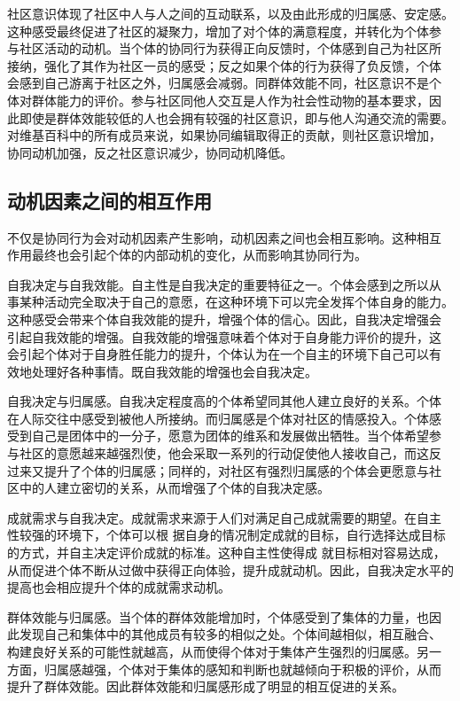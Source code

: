 社区意识体现了社区中人与人之间的互动联系，以及由此形成的归属感、安定感。
这种感受最终促进了社区的凝聚力，增加了对个体的满意程度，并转化为个体参
与社区活动的动机。当个体的协同行为获得正向反馈时，个体感到自己为社区所
接纳，强化了其作为社区一员的感受；反之如果个体的行为获得了负反馈，个体
会感到自己游离于社区之外，归属感会减弱。同群体效能不同，社区意识不是个
体对群体能力的评价。参与社区同他人交互是人作为社会性动物的基本要求，因
此即使是群体效能较低的人也会拥有较强的社区意识，即与他人沟通交流的需要。
对维基百科中的所有成员来说，如果协同编辑取得正的贡献，则社区意识增加，
协同动机加强，反之社区意识减少，协同动机降低。


\subsection{动机因素之间的相互作用}
\label{sec:interaction}
不仅是协同行为会对动机因素产生影响，动机因素之间也会相互影响。这种相互
作用最终也会引起个体的内部动机的变化，从而影响其协同行为。

自我决定与自我效能。自主性是自我决定的重要特征之一。个体会感到之所以从
事某种活动完全取决于自己的意愿，在这种环境下可以完全发挥个体自身的能力。
这种感受会带来个体自我效能的提升，增强个体的信心。因此，自我决定增强会
引起自我效能的增强。自我效能的增强意味着个体对于自身能力评价的提升，这
会引起个体对于自身胜任能力的提升，个体认为在一个自主的环境下自己可以有
效地处理好各种事情。既自我效能的增强也会自我决定。



自我决定与归属感。自我决定程度高的个体希望同其他人建立良好的关系。个体
在人际交往中感受到被他人所接纳。而归属感是个体对社区的情感投入。个体感
受到自己是团体中的一分子，愿意为团体的维系和发展做出牺牲。当个体希望参
与社区的意愿越来越强烈使，他会采取一系列的行动促使他人接收自己，而这反
过来又提升了个体的归属感；同样的，对社区有强烈归属感的个体会更愿意与社
区中的人建立密切的关系，从而增强了个体的自我决定感。

成就需求与自我决定。成就需求来源于人们对满足自己成就需要的期望。在自主
性较强的环境下，个体可以根
据自身的情况制定成就的目标，自行选择达成目标的方式，并自主决定评价成就的标准。这种自主性使得成
就目标相对容易达成，从而促进个体不断从过做中获得正向体验，提升成就动机。因此，自我决定水平的
提高也会相应提升个体的成就需求动机。

群体效能与归属感。当个体的群体效能增加时，个体感受到了集体的力量，也因
此发现自己和集体中的其他成员有较多的相似之处。个体间越相似，相互融合、
构建良好关系的可能性就越高，从而使得个体对于集体产生强烈的归属感。另一
方面，归属感越强，个体对于集体的感知和判断也就越倾向于积极的评价，从而
提升了群体效能。因此群体效能和归属感形成了明显的相互促进的关系。


